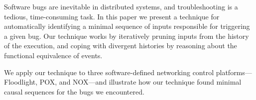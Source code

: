 Software bugs are inevitable in distributed systems, and troubleshooting
is a tedious, time-consuming task.
In this paper we present a technique for automatically identifying
a minimal sequence of inputs responsible for triggering a given bug.
Our technique works by
iteratively pruning inputs from the history of the execution, and
coping with divergent histories by reasoning about the functional equivalence
of events.

We apply our technique to three software-defined networking control
platforms---Floodlight, POX, and NOX---and
illustrate how our technique found minimal causal sequences for
the bugs we encountered.
